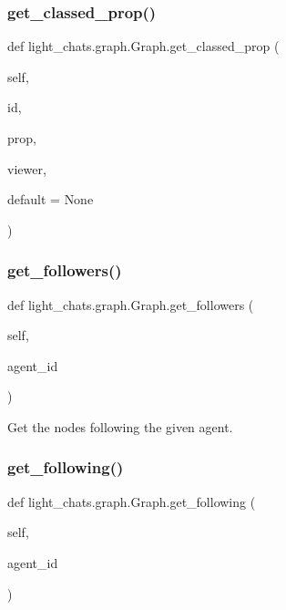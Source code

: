 \subsubsection{\texorpdfstring{get\+\_\+classed\+\_\+prop()}{get\_classed\_prop()}}
{\footnotesize\ttfamily def light\+\_\+chats.\+graph.\+Graph.\+get\+\_\+classed\+\_\+prop (\begin{DoxyParamCaption}\item[{}]{self,  }\item[{}]{id,  }\item[{}]{prop,  }\item[{}]{viewer,  }\item[{}]{default = {\ttfamily None} }\end{DoxyParamCaption})}

\mbox{\label{classlight__chats_1_1graph_1_1Graph_add43b11ac4acd2b8db044599c492564a}} 
\subsubsection{\texorpdfstring{get\+\_\+followers()}{get\_followers()}}
{\footnotesize\ttfamily def light\+\_\+chats.\+graph.\+Graph.\+get\+\_\+followers (\begin{DoxyParamCaption}\item[{}]{self,  }\item[{}]{agent\+\_\+id }\end{DoxyParamCaption})}

\begin{DoxyVerb}Get the nodes following the given agent.
\end{DoxyVerb}
 \mbox{\label{classlight__chats_1_1graph_1_1Graph_a1f4c0ccc957a89dcec003a73553914b7}} 
\subsubsection{\texorpdfstring{get\+\_\+following()}{get\_following()}}
{\footnotesize\ttfamily def light\+\_\+chats.\+graph.\+Graph.\+get\+\_\+following (\begin{DoxyParamCaption}\item[{}]{self,  }\item[{}]{agent\+\_\+id }\end{DoxyParamCaption})}

